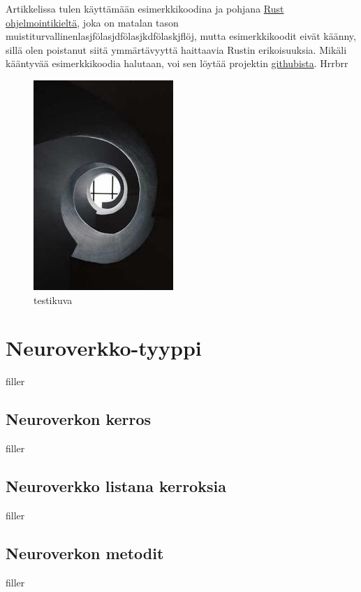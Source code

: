 \documentclass{article}
\begin{document}
Artikkelissa tulen käyttämään esimerkkikoodina ja pohjana \href {https://www.rust-lang.org/}{Rust ohjelmointikieltä}, joka on matalan tason muistiturvallinenlasjfölasjdfölasjkdfölaskjflöj,%
mutta esimerkkikoodit eivät käänny, sillä olen poistanut siitä ymmärtävyyttä haittaavia Rustin erikoisuuksia. Mikäli kääntyvää esimerkkikoodia halutaan,
voi sen löytää projektin \href{https://github.com/Joonas-vonlerber/rusticneurons}{githubista}.
Hrrbrr
\begin{figure}
    \centering
    \includegraphics{testimage.jpg}
    \caption{testikuva}
    \label{testikuva}
\end{figure}

\section{Neuroverkko-tyyppi}

filler

\subsection{Neuroverkon kerros}

filler

\subsection{Neuroverkko listana kerroksia}

filler

\subsection{Neuroverkon metodit}

filler
\end{document}
